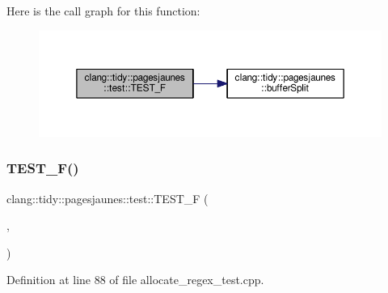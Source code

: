 Here is the call graph for this function\+:
\nopagebreak
\begin{figure}[H]
\begin{center}
\leavevmode
\includegraphics[width=350pt]{namespaceclang_1_1tidy_1_1pagesjaunes_1_1test_ae0602bb639990d9c0c7f823d5d187fc3_cgraph}
\end{center}
\end{figure}
\mbox{\label{namespaceclang_1_1tidy_1_1pagesjaunes_1_1test_a4940df4810156915d9d7f59f88f92ec7}} 
\subsubsection{\texorpdfstring{T\+E\+S\+T\+\_\+\+F()}{TEST\_F()}\hspace{0.1cm}{\footnotesize\ttfamily [21/57]}}
{\footnotesize\ttfamily clang\+::tidy\+::pagesjaunes\+::test\+::\+T\+E\+S\+T\+\_\+F (\begin{DoxyParamCaption}\item[{\hyperlink{classclang_1_1tidy_1_1pagesjaunes_1_1test_1_1_allocate_regex_test}{Allocate\+Regex\+Test}}]{,  }\item[{Regex\+Matching\+Weird\+Syntax}]{ }\end{DoxyParamCaption})}



Definition at line 88 of file allocate\+\_\+regex\+\_\+test.\+cpp.

